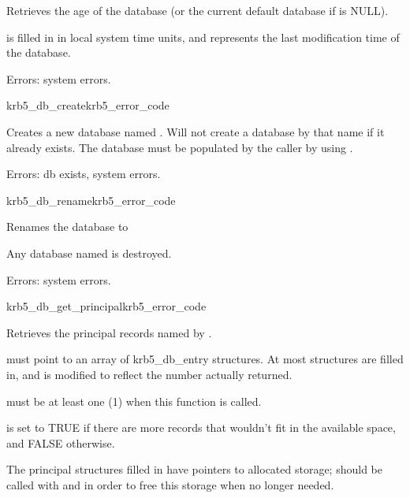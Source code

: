 Retrieves the age of the database  (or the current
default database if  is NULL).

 is filled in in local system time units, and represents
the last modification time of the database.

Errors: system errors.


\begin{funcdecl}{krb5_db_create}{krb5_error_code}{\funcin}
\end{funcdecl}

Creates a new database named .  Will not create a
database by that name if it already exists.  The database must be
populated by the caller by using .

Errors: db exists, system errors.

\begin{funcdecl}{krb5_db_rename}{krb5_error_code}{\funcin}
\end{funcdecl}
Renames the database  to 

Any database named  is destroyed.

Errors: system errors.

\begin{funcdecl}{krb5_db_get_principal}{krb5_error_code}{\funcin}
\funcout
{}
\funcinout
{}
\funcout
{}
\end{funcdecl}

Retrieves the principal records named by .

 must point to an array of 
krb5_db_entry structures.
At most  structures are filled in, and
 is modified to reflect the number actually returned.

 must be at least one (1) when this function is called.

 is set to TRUE if there are more records that wouldn't fit
in the available space, and FALSE otherwise.

The principal structures filled in have pointers to allocated storage;
 should be called with
 and 
in order to free this storage when no longer needed.


